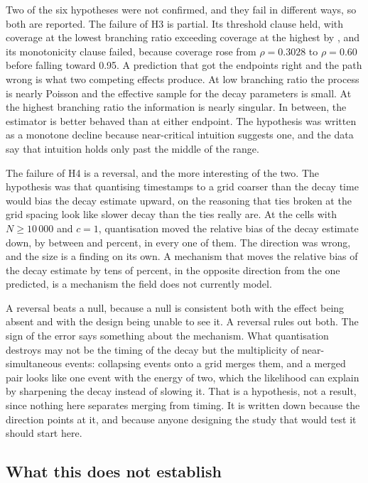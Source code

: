 Two of the six hypotheses were not confirmed, and they fail in different ways, so
both are reported. The failure of H3 is partial. Its threshold clause held, with
coverage at the lowest branching ratio exceeding coverage at the highest by
\DiscThreeT{}, and its monotonicity clause failed, because coverage rose from
$\rho = 0.3028$ to $\rho = 0.60$ before falling toward 0.95. A prediction that got
the endpoints right and the path wrong is what two competing effects produce. At low
branching ratio the process is nearly Poisson and the effective sample for the decay
parameters is small. At the highest branching ratio the information is nearly
singular. In between, the estimator is better behaved than at either endpoint. The
hypothesis was written as a monotone decline because near-critical intuition
suggests one, and the data say that intuition holds only past the middle of the
range.

The failure of H4 is a reversal, and the more interesting of the two. The hypothesis
was that quantising timestamps to a grid coarser than the decay time would bias the
decay estimate upward, on the reasoning that ties broken at the grid spacing look
like slower decay than the ties really are. At the \DiscFourCells{} cells with
$N \ge 10\,000$ and $c = 1$, quantisation moved the relative bias of the decay
estimate down, by between \DiscFourLow{} and \DiscFourHigh{} percent, in every one
of them. The direction was wrong, and the size is a finding on its own. A mechanism
that moves the relative bias of the decay estimate by tens of percent, in the
opposite direction from the one predicted, is a mechanism the field does not
currently model.

A reversal beats a null, because a null is consistent both with the effect being
absent and with the design being unable to see it. A reversal rules out both. The
sign of the error says something about the mechanism. What quantisation destroys may
not be the timing of the decay but the multiplicity of near-simultaneous events:
collapsing events onto a grid merges them, and a merged pair looks like one event
with the energy of two, which the likelihood can explain by sharpening the decay
instead of slowing it. That is a hypothesis, not a result, since nothing here
separates merging from timing. It is written down because the direction points at
it, and because anyone designing the study that would test it should start here.

\subsection{What this does not establish}

